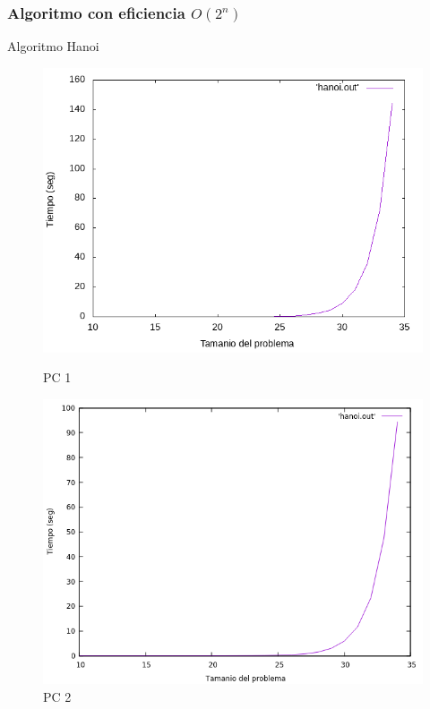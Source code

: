 \documentclass{beamer}
\begin{document}
\subsubsection{Algoritmo con eficiencia $O(2^n)$}

\begin{frame}[fragile]{Algoritmo Hanoi}
\begin{figure}[H]
\centering
\begin{minipage}{.5\textwidth}
  \centering
  \includegraphics[width=\linewidth]{empirica_hanoi.png}
   \caption*{PC 1}
\end{minipage}%
\begin{minipage}{.5\textwidth}
  \centering
  \includegraphics[width=\linewidth]{empirica_hanoi_2.png}
  \caption*{PC 2}
\end{minipage}
\end{figure}
\end{frame}
\end{document}
